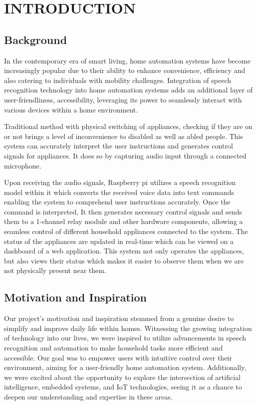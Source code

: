 \chapter{INTRODUCTION}
    \section{Background}
    In the contemporary era of smart living, home automation systems have become increasingly popular due to their ability to enhance convenience, efficiency and also catering to individuals with mobility challenges. Integration of speech recognition technology into home automation systems adds an additional layer of user-friendliness, accessibility, leveraging its power to seamlessly interact with various devices within a home environment.

    Traditional method with physical switching of appliances, checking if they are on or not brings a level of inconvenience to disabled as well as abled people. This system can accurately interpret the user instructions and generates control signals for appliances. It does so by capturing audio input through a connected microphone.

    Upon receiving the audio signals, Raspberry pi utilizes a speech recognition model within it which converts the received voice data into text commands enabling the system to comprehend user instructions accurately. Once the command is interpreted, It then generates necessary control signals and sends them to a 1-channel relay module and other hardware components, allowing a seamless control of different household appliances connected to the system. The status of the appliances are updated in real-time which can be viewed on a dashboard of a web application. This system not only operates the appliances, but also views their status which makes it easier to observe them  when we are not physically present near them.

    \section{Motivation and Inspiration}
    Our project's motivation and inspiration stemmed from a genuine desire to simplify and improve daily life within homes. Witnessing the growing integration of technology into our lives, we were inspired to utilize advancements in speech recognition and automation to make household tasks more efficient and accessible. Our goal was to empower users with intuitive control over their environment, aiming for a user-friendly home automation system. Additionally, we were excited about the opportunity to explore the intersection of artificial intelligence, embedded systems, and IoT technologies, seeing it as a chance to deepen our understanding and expertise in these areas. 
    

